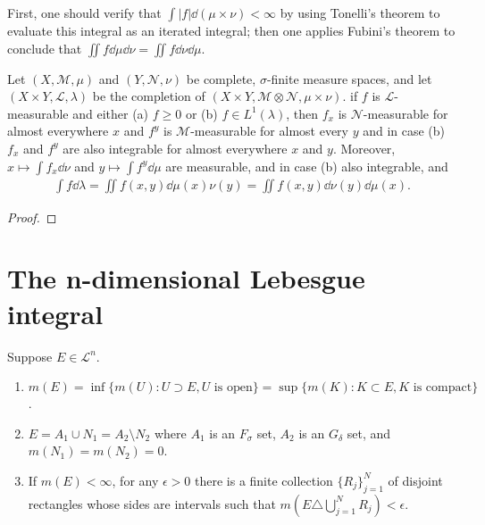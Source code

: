 First, one should verify that $\int |f| \dd (\mu \times \nu) < \infty$ by using Tonelli's theorem to evaluate this integral as an iterated integral; then one applies Fubini's theorem to conclude that $\iint f \dd \mu \dd \nu = \iint f \dd \nu \dd \mu$.

\begin{theorem}
    Let $(X, \mathcal{M}, \mu)$ and $(Y, \mathcal{N}, \nu)$ be complete, $\sigma$-finite measure spaces, and let $(X \times Y, \mathcal{L}, \lambda)$ be the completion of $(X \times Y, \mathcal{M} \otimes \mathcal{N}, \mu \times \nu)$.
    if $f$ is $\mathcal{L}$-measurable and either (a) $f \ge 0$ or (b) $f \in L^1(\lambda)$, then $f_x$ is $\mathcal{N}$-measurable for almost everywhere $x$ and $f^y$ is $\mathcal{M}$-measurable for almost every $y$ and in case (b) $f_x$ and $f^y$ are also integrable for almost everywhere $x$ and $y$.
    Moreover, $x \mapsto \int f_x \dd \nu$ and $y \mapsto \int f^y \dd \mu$ are measurable, and in case (b) also integrable, and 
    \begin{align}
        \int f \dd \lambda = \iint f(x, y) \dd \mu(x) \nu(y) = \iint f(x, y) \dd \nu(y) \dd \mu(x).
    \end{align}
\end{theorem}

\begin{proof}
    
\end{proof}

\section{The n-dimensional Lebesgue integral}

\begin{theorem}
    Suppose $E \in \mathcal{L}^n$.
    \begin{enumerate}
        \item $m(E) = \inf \{ m(U): U \supset E, U \text{ is open} \} = \sup \{ m(K): K \subset E, K \text{ is compact} \}$.
        \item $E = A_1 \cup N_1 = A_2 \setminus N_2$ where $A_1$ is an $F_\sigma$ set, $A_2$ is an $G_\delta$ set, and $m(N_1) = m(N_2) = 0$.
        \item If $m(E) < \infty$, for any $\epsilon > 0$ there is a finite collection $\{ R_j \}_{j=1}^{N}$ of disjoint rectangles whose sides are intervals such that $m(E \triangle \bigcup_{j=1}^{N} R_j) < \epsilon$.
    \end{enumerate}
\end{theorem}

